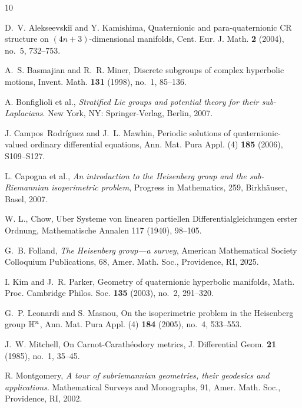 \documentclass [12pt,a4paper]{amsart}
\theoremstyle{plain}
\theoremstyle{definition}
\numberwithin{equation}{section}
\begin{document}
\begin{thebibliography}{10}


D.~V. Alekseevski\u i{} and Y. Kamishima, Quaternionic and para-quaternionic CR structure on $(4n+3)$-dimensional manifolds, Cent. Eur. J. Math. {\bf 2} (2004), no.~5, 732--753.

A.~S. Basmajian and R.~R. Miner, Discrete subgroups of complex hyperbolic motions, Invent. Math. {\bf 131} (1998), no.~1, 85--136.
  
  
A. Bonfiglioli et al., {\it Stratified Lie groups and potential theory for their sub-Laplacians}. New York, NY: Springer-Verlag, Berlin, 2007.
  
  J. Campos~Rodr\'iguez and J.~L. Mawhin, Periodic solutions of quaternionic-valued ordinary differential equations, Ann. Mat. Pura Appl. (4) {\bf 185} (2006), S109--S127.
 
   
L. Capogna et al., {\it An introduction to the Heisenberg group and the sub-Riemannian isoperimetric problem}, Progress in Mathematics, 259, Birkh\"auser, Basel, 2007.

W. L.,  Chow, Uber Systeme von linearen partiellen Differentialgleichungen erster Ordnung, 
Mathematische Annalen 117 (1940), 98--105.
  


G.~B. Folland, {\it The Heisenberg group---a survey}, American Mathematical Society Colloquium Publications, 68, Amer. Math. Soc., Providence, RI,  2025.

 I. Kim and J.~R. Parker, Geometry of quaternionic hyperbolic manifolds, Math. Proc. Cambridge Philos. Soc. {\bf 135} (2003), no.~2, 291--320.


G.~P. Leonardi and S. Masnou, On the isoperimetric problem in the Heisenberg group ${\Bbb H}^n$, Ann. Mat. Pura Appl. (4) {\bf 184} (2005), no.~4, 533--553.

  
J.~W. Mitchell, On Carnot-Carath\'eodory metrics, J. Differential Geom. {\bf 21} (1985), no.~1, 35--45.

R. Montgomery, {\it A tour of subriemannian geometries, their geodesics and applications}. 
Mathematical Surveys and Monographs, 91, Amer. Math. Soc., Providence, RI,  2002.


\end{thebibliography}
\end{document}
